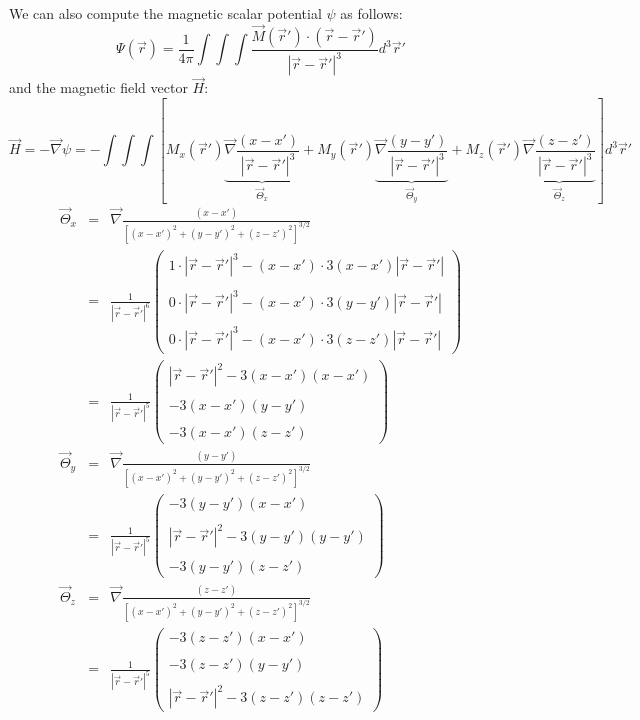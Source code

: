 We can also compute the magnetic scalar potential $\psi$ as follows:
\[
\Psi (\vec r)= \frac{1}{4\pi} \int\int\int \frac{{\vec M}({\vec r}') \cdot ({\vec r}-{\vec r}')}{|{\vec r}-{\vec r}'|^3} 
d^3{\vec r}'
\]
and the magnetic field vector $\vec H$:
\[
\vec H = -\vec\nabla \psi = 
- \int\int\int 
\left[
 M_x({\vec r}') \underbrace{\vec\nabla \frac{ (x-x')}{|{\vec r}-{\vec r}'|^3}}_{\vec\Theta_x} +   
 M_y({\vec r}') \underbrace{\vec\nabla \frac{ (y-y')}{|{\vec r}-{\vec r}'|^3}}_{\vec\Theta_y} +   
 M_z({\vec r}') \underbrace{\vec\nabla \frac{ (z-z')}{|{\vec r}-{\vec r}'|^3}}_{\vec\Theta_z}    
\right] 
d^3{\vec r}'
\]
\begin{eqnarray}
\vec\Theta_x 
&=& \vec\nabla \frac{ (x-x')}{ [(x-x')^2+(y-y')^2+(z-z')^2]^{3/2}   } \\
&=&
\frac{1}{|{\vec r}-{\vec r}'|^6}
\left(\begin{array}{c}
1 \cdot |{\vec r}-{\vec r}'|^3 - (x-x') \cdot 3 (x-x') |{\vec r}-{\vec r}'| \\ \\
0 \cdot |{\vec r}-{\vec r}'|^3 - (x-x') \cdot 3 (y-y') |{\vec r}-{\vec r}'| \\ \\
0 \cdot |{\vec r}-{\vec r}'|^3 - (x-x') \cdot 3 (z-z') |{\vec r}-{\vec r}'| 
\end{array}\right) \\
&=& 
\frac{1}{|{\vec r}-{\vec r}'|^5}
\left(\begin{array}{c}
|{\vec r}-{\vec r}'|^2 - 3(x-x') (x-x')  \\ \\
- 3(x-x')(y-y')  \\ \\
- 3(x-x')(z-z')  
\end{array}\right) \\ 
\vec\Theta_y 
&=& \vec\nabla \frac{ (y-y')}{ [(x-x')^2+(y-y')^2+(z-z')^2]^{3/2}   } \\
&=& 
\frac{1}{|{\vec r}-{\vec r}'|^5}
\left(\begin{array}{c}
- 3(y-y') (x-x')  \\ \\
|{\vec r}-{\vec r}'|^2 - 3(y-y')(y-y')  \\ \\
- 3(y-y')(z-z')  
\end{array}\right) \\ 
\vec\Theta_z 
&=& \vec\nabla \frac{ (z-z')}{ [(x-x')^2+(y-y')^2+(z-z')^2]^{3/2}   } \\
&=& 
\frac{1}{|{\vec r}-{\vec r}'|^5}
\left(\begin{array}{c}
- 3(z-z') (x-x')  \\ \\
- 3(z-z')(y-y')  \\ \\
|{\vec r}-{\vec r}'|^2 - 3(z-z')(z-z')  
\end{array}\right) \\ 
\end{eqnarray}






